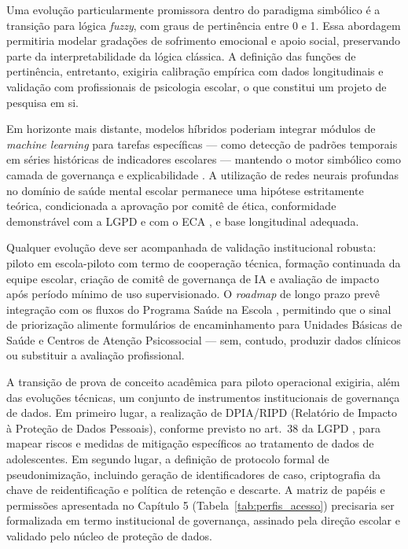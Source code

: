 \documentclass[
    12pt,
    openright,
    oneside,
    a4paper,
    english,
    brazil
]{abntex2}
\begin{document}
Uma evolu\c{c}\~ao particularmente promissora dentro do paradigma simb\'olico \'e a transi\c{c}\~ao para l\'ogica \textit{fuzzy}, com graus de pertin\^encia entre 0 e 1. Essa abordagem permitiria modelar grada\c{c}\~oes de sofrimento emocional e apoio social, preservando parte da interpretabilidade da l\'ogica cl\'assica. A defini\c{c}\~ao das fun\c{c}\~oes de pertin\^encia, entretanto, exigiria calibra\c{c}\~ao emp\'irica com dados longitudinais e valida\c{c}\~ao com profissionais de psicologia escolar, o que constitui um projeto de pesquisa em si.

Em horizonte mais distante, modelos h\'ibridos poderiam integrar m\'odulos de \textit{machine learning} para tarefas espec\'ificas --- como detec\c{c}\~ao de padr\~oes temporais em s\'eries hist\'oricas de indicadores escolares --- mantendo o motor simb\'olico como camada de governan\c{c}a e explicabilidade \cite{jobin_ai_ethics_2019}. A utiliza\c{c}\~ao de redes neurais profundas no dom\'inio de sa\'ude mental escolar permanece uma hip\'otese estritamente te\'orica, condicionada a aprova\c{c}\~ao por comit\^e de \'etica, conformidade demonstr\'avel com a LGPD \cite{brasil_lgpd_2018} e com o ECA \cite{brasil_eca_1990}, e base longitudinal adequada.

Qualquer evolu\c{c}\~ao deve ser acompanhada de valida\c{c}\~ao institucional robusta: piloto em escola-piloto com termo de coopera\c{c}\~ao t\'ecnica, forma\c{c}\~ao continuada da equipe escolar, cria\c{c}\~ao de comit\^e de governan\c{c}a de IA e avalia\c{c}\~ao de impacto ap\'os per\'iodo m\'inimo de uso supervisionado. O \textit{roadmap} de longo prazo prev\^e integra\c{c}\~ao com os fluxos do Programa Sa\'ude na Escola \cite{brasil_pse_2007}, permitindo que o sinal de prioriza\c{c}\~ao alimente formul\'arios de encaminhamento para Unidades B\'asicas de Sa\'ude e Centros de Aten\c{c}\~ao Psicossocial --- sem, contudo, produzir dados cl\'inicos ou substituir a avalia\c{c}\~ao profissional.

A transi\c{c}\~ao de prova de conceito acad\^emica para piloto operacional exigiria, al\'em das evolu\c{c}\~oes t\'ecnicas, um conjunto de instrumentos institucionais de governan\c{c}a de dados. Em primeiro lugar, a realiza\c{c}\~ao de DPIA/RIPD (Relat\'orio de Impacto \`a Prote\c{c}\~ao de Dados Pessoais), conforme previsto no art.~38 da LGPD \cite{brasil_lgpd_2018}, para mapear riscos e medidas de mitiga\c{c}\~ao espec\'ificos ao tratamento de dados de adolescentes. Em segundo lugar, a defini\c{c}\~ao de protocolo formal de pseudonimiza\c{c}\~ao, incluindo gera\c{c}\~ao de identificadores de caso, criptografia da chave de reidentifica\c{c}\~ao e pol\'itica de reten\c{c}\~ao e descarte. A matriz de pap\'eis e permiss\~oes apresentada no Cap\'itulo 5 (Tabela~\ref{tab:perfis_acesso}) precisaria ser formalizada em termo institucional de governan\c{c}a, assinado pela dire\c{c}\~ao escolar e validado pelo n\'ucleo de prote\c{c}\~ao de dados.
\end{document}
